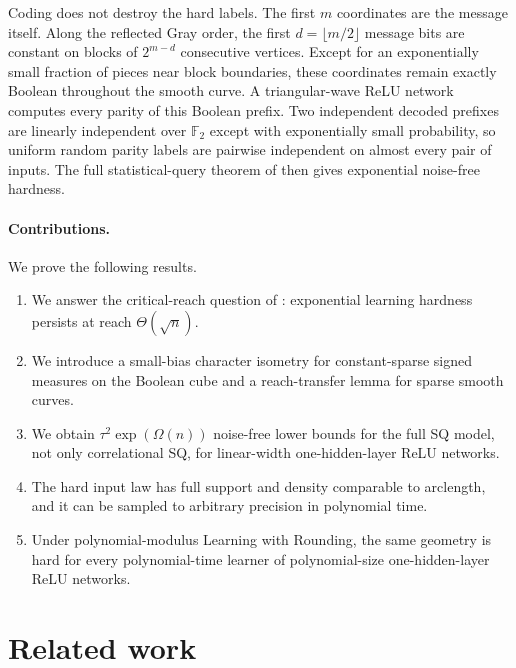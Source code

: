 \documentclass{article}
\theoremstyle{definition}
\theoremstyle{remark}
\newcommand{\Ftwo}{\mathbb F_2}
\newcommand{\1}{\mathbf 1}
\begin{document}
Coding does not destroy the hard labels. The first $m$ coordinates are the message itself. Along the reflected Gray order, the first $d=\lfloor m/2\rfloor$ message bits are constant on blocks of $2^{m-d}$ consecutive vertices. Except for an exponentially small fraction of pieces near block boundaries, these coordinates remain exactly Boolean throughout the smooth curve. A triangular-wave ReLU network computes every parity of this Boolean prefix. Two independent decoded prefixes are linearly independent over $\Ftwo$ except with exponentially small probability, so uniform random parity labels are pairwise independent on almost every pair of inputs. The full statistical-query theorem of \citet{chen2022noisefree} then gives exponential noise-free hardness.

\paragraph{Contributions.} We prove the following results.
\begin{enumerate}
\item We answer the critical-reach question of \citet{kiani2024manifold}: exponential learning hardness persists at reach $\Theta(\sqrt n)$.
\item We introduce a small-bias character isometry for constant-sparse signed measures on the Boolean cube and a reach-transfer lemma for sparse smooth curves.
\item We obtain $\tau^2\exp(\Omega(n))$ noise-free lower bounds for the full SQ model, not only correlational SQ, for linear-width one-hidden-layer ReLU networks.
\item The hard input law has full support and density comparable to arclength, and it can be sampled to arbitrary precision in polynomial time.
\item Under polynomial-modulus Learning with Rounding, the same geometry is hard for every polynomial-time learner of polynomial-size one-hidden-layer ReLU networks.
\end{enumerate}

\section{Related work}
\end{document}
